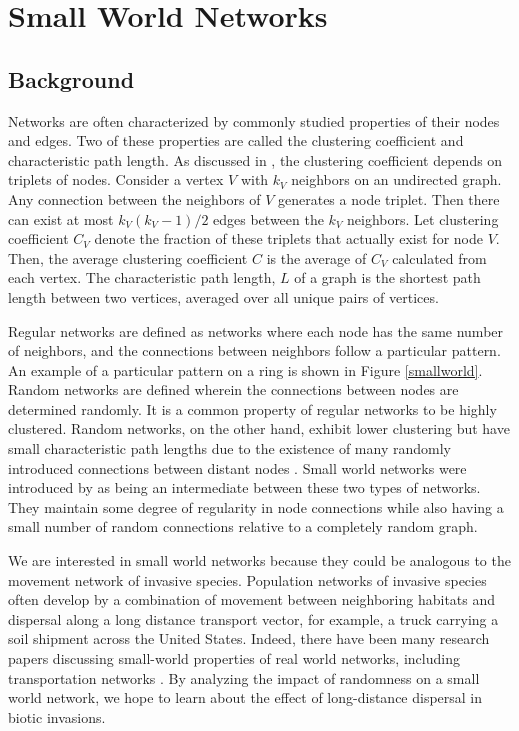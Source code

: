 \documentclass[12pt, openany]{book}
\theoremstyle{definition}
\theoremstyle{remark}
\numberwithin{equation}{chapter}
\numberwithin{figure}{chapter}
\begin{document}
\chapter{Small World Networks}
\section{Background}
Networks are often characterized by commonly studied properties of their nodes and edges. Two of these properties are called the clustering coefficient and characteristic path length. As discussed in \cite{watts1998collective}, the clustering coefficient depends on triplets of nodes. Consider a vertex $V$ with $k_V$ neighbors on an undirected graph. Any connection between the neighbors of $V$ generates a node triplet. Then there can exist at most $k_V(k_V-1)/2$ edges between the $k_V$ neighbors. Let clustering coefficient $C_V$ denote the fraction of these triplets that actually exist for node $V$. Then, the average clustering coefficient $C$ is the average of $C_V$ calculated from each vertex. The characteristic path length, $L$ of a graph is the shortest path length between two vertices, averaged over all unique pairs of vertices. 

Regular networks are defined as networks where each node has the same number of neighbors, and the connections between neighbors follow a particular pattern. An example of a particular pattern on a ring is shown in Figure \ref{smallworld}. Random networks are defined wherein the connections between nodes are determined randomly. It is a common property of regular networks to be highly clustered. Random networks, on the other hand, exhibit lower clustering but have small characteristic path lengths due to the existence of many randomly introduced connections between distant nodes \citep{walsh1999search}. Small world networks were introduced by \cite{watts1998collective} as being an intermediate between these two types of networks. They maintain some degree of regularity in node connections while also having a small number of random connections relative to a completely random graph.

We are interested in small world networks because they could be analogous to the movement network of invasive species. Population networks of invasive species often develop by a combination of movement between neighboring habitats and dispersal along a long distance transport vector, for example, a truck carrying a soil shipment across the United States. Indeed, there have been many research papers discussing small-world properties of real world networks, including transportation networks \citep{latora2001efficient}. By analyzing the impact of randomness on a small world network, we hope to learn about the effect of long-distance dispersal in biotic invasions.
\end{document}
